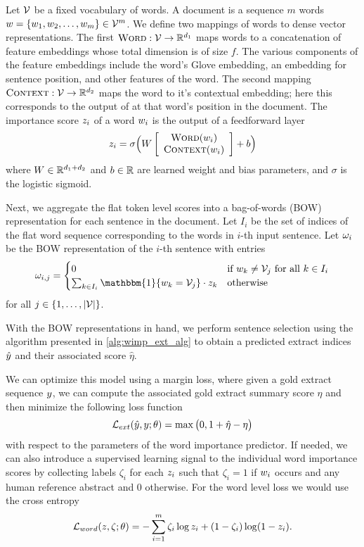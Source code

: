 Let $\mathcal{V}$ be a fixed vocabulary of words. A document is a sequence $m$
words $w = \{w_1, w_2, \ldots, w_m\} \in \mathcal{V}^m$.
We define two mappings of words to dense vector representations.
The first $\textsc{Word} : \mathcal{V} \rightarrow \mathbb{R}^{d_1}$ maps words to 
a concatenation of feature embeddings whose total dimension is of size $f$. 
The various components of the feature embeddings include the word's Glove 
embedding, an embedding for sentence position, and other features of the word.
The second mapping
$\textsc{Context} : \mathcal{V} \rightarrow \mathbb{R}^{d_2}$ maps the word to it's contextual
embedding; here this corresponds to the output of \elmo at that word's
position in the document. 
The importance score $z_i$ of a word $w_i$ is the output of 
a feedforward layer 
\[ z_i = \sigma\Big(W \left[\begin{array}{c} \textsc{Word}(w_i) \\ \textsc{Context}(w_i) \end{array} \right] + b \Big) \]
    where $W \in \mathbb{R}^{d_1 + d_2}$ and $b \in \mathbb{R}$ are learned weight
and bias parameters, and $\sigma$ is the logistic sigmoid.

Next, we aggregate the flat token level scores into a bag-of-words (BOW) 
representation for each sentence in the document.
Let $I_i$ be the set of indices of the flat word sequence corresponding
to the words in $i$-th input sentence. Let $\omega_i$ be the BOW 
representation of the $i$-th sentence with entries 
\[ \bow_{i,j} = \begin{cases} 
    0 & \textrm{if $\word_k \ne \vocab_j $ for all $k \in I_i $} \\ 
\sum_{k \in I_i} \mathbbm{1}\{\word_k = \vocab_j \} \cdot \wordImportance_k  & \textrm{otherwise}     \end{cases} \]
        for all $j \in \{1, \ldots, |\mathcal{V}|\}$.





        With the BOW representations in hand, we perform sentence selection
        using the algorithm presented in \autoref{alg:wimp_ext_alg} to 
        obtain a predicted extract indices $\hat{y}$ and their associated
        score $\hat{\eta}$.

        We can optimize this model using a margin loss, where given a 
        gold extract sequence  $y$, we can compute the associated
        gold extract summary score $\eta$ and then minimize the following
        loss function \[\mathcal{L}_{ext}(\hat{y}, y;\theta) = \max\big(0, 1 + \hat{\eta} - \eta\big)\]
        with respect to the parameters of the word importance predictor.
        If needed, we can also introduce a supervised learning signal to the 
        individual word importance scores by collecting labels $\zeta_i$ for
        each $z_i$ such that $\zeta_i = 1$ if $w_i$ occurs
        and any human reference abstract and $0$ otherwise. For the word level
        loss we would use the cross entropy 
        \[ \mathcal{L}_{word}(z, \zeta; \theta) = -\sum_{i=1}^m \zeta_i \log z_i + (1 - \zeta_i) \log (1 - z_i). \] 




